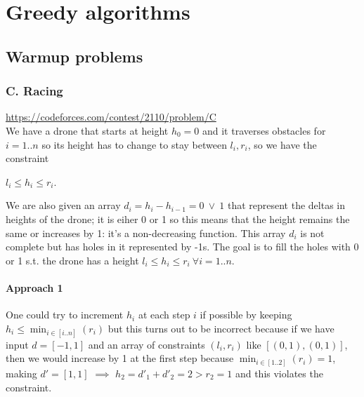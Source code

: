 


\chapter{Greedy algorithms}

\section{Warmup problems}
\subsection{C. Racing}
\url{https://codeforces.com/contest/2110/problem/C} \\

We have a drone that starts at height $h_0 = 0$ and it traverses obstacles for $i = 1..n$ so its height has to change to stay between $l_i, r_i$, so we have the constraint
\begin{center}
    $l_i \leq h_i \leq r_i$.
\end{center}

We are also given an array $d_i = h_i - h_{i-1} = 0\ \lor\ 1$ that represent the deltas in heights of the drone; it is eiher 0 or 1 so this means that the height remains the same or increases by 1: it's a non-decreasing function. This array $d_i$ is not complete but has holes in it represented by -1s. The goal is to fill the holes with 0 or 1 s.t. the drone has a height $l_i \leq h_i \leq r_i\ \forall i=1..n$.

\subsubsection{Approach 1}
One could try to increment $h_i$ at each step $i$ if possible by keeping $h_i \leq \min_{i \in [i..n]}(r_i)$ but this turns out to be incorrect because if we have input $d= [-1, 1]$ and an array of constraints $(l_i,r_i)$ like $[(0,1), (0,1)]$, then we would increase by 1 at the first step because $\min_{i \in [1..2]}(r_i) = 1$, making $d' = [1, 1]$ $\implies$ $h_2 =d'_1 + d'_2 = 2 > r_2 =1$ and this violates the constraint.

